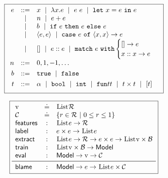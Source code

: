 \begin{figure}
\centering
\begin{minipage}[c]{.4\textwidth}
\[
\boxed{
\begin{array}{rcl}
e & ::=    & x \ \mid\  \lambda x. e \ \mid\  e\ e \ \mid\  \mathtt{let}\ x = e\ \mathtt{in}\ e \\
  & \ \mid\  & n \ \mid\  e + e\\
  & \ \mid\  & b \ \mid\  \mathtt{if}\ e\ \mathtt{then}\ e\ \mathtt{else}\ e \\
  & \ \mid\  & \langle e, e \rangle \ \mid\  \mathtt{case}\ e\ \mathtt{of}\ \langle x, x \rangle \to e \\
  & \ \mid\  & \mathtt{[]} \ \mid\  e :: e \ \mid\  \mathtt{match}\ e\ \mathtt{with} \begin{cases} \mathtt{[]} \to e\\ x :: x \to e \end{cases} \\[0.05in]

n & ::= &  0, 1, -1, \ldots \\[0.05in]

b & ::= &  \mathtt{true} \ \mid\  \mathtt{false} \\[0.05in]

t & ::= & \alpha \ \mid\  \mathtt{bool} \ \mid\  \mathtt{int} \ \mid\  \mathtt{fun}{t}{t} \ \mid\  t \times t \ \mid\  [t] \\[0.05in]
\end{array}
}
\]
\label{fig:syntax}
\end{minipage}
\hfill
\begin{minipage}[c]{.45\textwidth}
\lstDeleteShortInline{|} %
\[
\boxed{
\begin{array}{lcl}
  \V          & \defeq & \List{\R}\\
  \Runit      & \defeq & \{r \in \R\ |\ 0 \le r \le 1\} \\ %
  \featuresym & : & \List{e \to \R} \\
  \labelsym   & : & e \times e \to \List{e} \\
  \extractsym & : & \List{e \to \R} \to e \times e \to \List{\V \times \B} \\
  \trainsym   & : & \List{\V \times \B} \to \Model \\
  \evalsym    & : & \Model \to \V \to \Runit \\
  \midrule
  \blamesym   & : & \Model \to e \to \List{e \times \Runit}
\end{array}
}
\]
\lstMakeShortInline{|}
\label{fig:api}
\end{minipage}
\end{figure}

